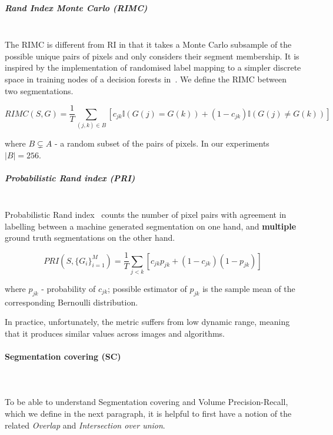\subparagraph{Rand Index Monte Carlo (RIMC)}\mbox{}\\ %
\label{par:ch4-RIMC-maths}
The RIMC is different from RI in that it takes a Monte Carlo subsample of the possible unique pairs of pixels and only considers their segment membership. It is inspired by the implementation of randomised label mapping to a simpler discrete space in training nodes of a decision forests in~\cite{DollarICCV13edges}. We define the RIMC between two segmentations.

\begin{equation}
RIMC(S,G)=\frac{1}{T}\sum\limits _{(j,k)\in B}\left[c_{jk}\mathbb{I}\left(G(j)=G(k)\right)+(1-c_{jk})\mathbb{I}\left(G(j)\neq G(k)\right)\right]
\end{equation}

where $B\subsetneq A$ - a random subset of the pairs of pixels.
In our experiments $|B|=256$.


\subparagraph{Probabilistic Rand index (PRI)}\mbox{}\\
\label{par:ch4-PRI-maths}
Probabilistic Rand index~\cite{UnnikrishnanPH07} counts the number of pixel pairs with agreement in %
labelling between a machine generated segmentation on one hand, and \textbf{multiple} ground truth segmentations on the other hand.


\begin{equation}
PRI(S,\{G_{i}\}_{i=1}^{M})=\frac{1}{T}\sum\limits _{j<k}\left[c_{jk}p_{jk}+\left(1-c_{jk}\right)\left(1-p_{jk}\right)\right]
\end{equation}

where $p_{jk}$ - probability of $c_{jk}$; possible estimator of
$p_{jk}$ is the sample mean of the corresponding Bernoulli distribution.

In practice, unfortunately, the metric suffers from low dynamic range, meaning that it produces similar values across images and algorithms.

\paragraph{Segmentation covering (SC)}\mbox{}\\\mbox{}\\
\label{par:ch4-SC-maths}
To be able to understand Segmentation covering and Volume Precision-Recall, which we define in the next paragraph, it is helpful to first have a notion of the related \textit{Overlap} and \textit{Intersection over union}.

